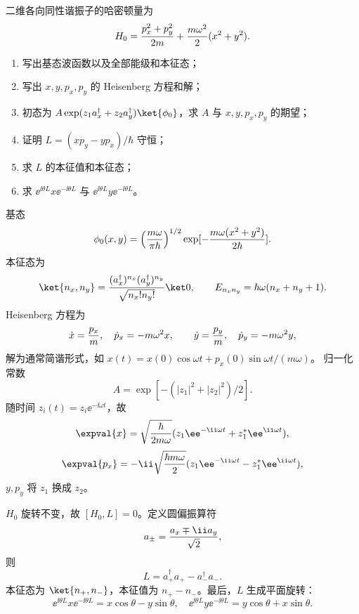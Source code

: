 \begin{question}
二维各向同性谐振子的哈密顿量为
\[
  H_0={p_x^2+p_y^2\over2m}+{m\omega^2\over2}(x^2+y^2).
\]
\begin{enumerate}
  \item 写出基态波函数以及全部能级和本征态；
  \item 写出 $x,y,p_x,p_y$ 的 Heisenberg 方程和解；
  \item 初态为 $A\exp(z_1a_x^\dagger+z_2a_y^\dagger)\ket{\phi_0}$，求 $A$ 与 $x,y,p_x,p_y$ 的期望；
  \item 证明 $L=(xp_y-yp_x)/\hbar$ 守恒；
  \item 求 $L$ 的本征值和本征态；
  \item 求 $\ee^{\ii\theta L}x\ee^{-\ii\theta L}$ 与 $\ee^{\ii\theta L}y\ee^{-\ii\theta L}$。
\end{enumerate}
\begin{solution}
基态
\[
  \phi_0(x,y)=\left({m\omega\over\pi\hbar}\right)^{1/2}\exp[-{m\omega(x^2+y^2)\over2\hbar}].
\]
本征态为
\[
  \ket{n_x,n_y}={(a_x^\dagger)^{n_x}(a_y^\dagger)^{n_y}\over\sqrt{n_x!n_y!}}\ket0,
  \qquad E_{n_xn_y}=\hbar\omega(n_x+n_y+1).
\]
Heisenberg 方程为
\[
  \dot x={p_x\over m},\quad \dot p_x=-m\omega^2x,
  \qquad \dot y={p_y\over m},\quad \dot p_y=-m\omega^2y,
\]
解为通常简谐形式，如 $x(t)=x(0)\cos\omega t+p_x(0)\sin\omega t/(m\omega)$。
归一化常数
\[
  A=\exp[-(|z_1|^2+|z_2|^2)/2].
\]
随时间 $z_i(t)=z_i\ee^{-\ii\omega t}$，故
\[
  \expval{x}=\sqrt{\hbar\over2m\omega}(z_1\ee^{-\ii\omega t}+z_1^*\ee^{\ii\omega t}),
\]
\[
  \expval{p_x}=-\ii\sqrt{\hbar m\omega\over2}(z_1\ee^{-\ii\omega t}-z_1^*\ee^{\ii\omega t}),
\]
$y,p_y$ 将 $z_1$ 换成 $z_2$。

$H_0$ 旋转不变，故 $[H_0,L]=0$。定义圆偏振算符
\[
  a_\pm={a_x\mp\ii a_y\over\sqrt2},
\]
则
\[
  L=a_+^\dagger a_+-a_-^\dagger a_-.
\]
本征态为 $\ket{n_+,n_-}$，本征值为 $n_+-n_-$。最后，$L$ 生成平面旋转：
\[
  \ee^{\ii\theta L}x\ee^{-\ii\theta L}=x\cos\theta-y\sin\theta,
  \quad
  \ee^{\ii\theta L}y\ee^{-\ii\theta L}=y\cos\theta+x\sin\theta.
\]
\end{solution}
\end{question}


